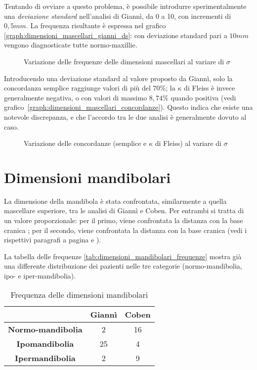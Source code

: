 Tentando di ovviare a questo problema, è possibile introdurre sperimentalmente una \emph{deviazione standard} nell'analisi di Giannì, da 0 a 10, con incrementi di $0,5 mm$. La frequenza risultante è espressa nel grafico \vref{graph:dimensioni_mascellari_gianni_ds}: con deviazione standard pari a $10 mm$ vengono diagnosticate tutte normo-maxillie.

\begin{figure}[ht!]
\centering

\caption{Variazione delle frequenze delle dimensioni mascellari al variare di $\sigma$}
\label{graph:dimensioni_mascellari_gianni_ds}
\end{figure}

Introducendo una deviazione standard al valore proposto da Giannì, solo la concordanza semplice raggiunge valori di più del $70\%$; la $\kappa$ di Fleiss è invece generalmente negativa, o con valori di massimo $8,74\%$ quando positiva (vedi grafico~\vref{graph:dimensioni_mascellari_concordanze}). Questo indica che esiste una notevole discrepanza, e che l'accordo tra le due analisi è generalmente dovuto al caso.

\begin{figure}[ht!]
\centering

\caption{Variazione delle concordanze (semplice e $\kappa$ di Fleiss) al variare di $\sigma$}
\label{graph:dimensioni_mascellari_concordanze}
\end{figure}

\section{Dimensioni mandibolari}
La dimensione della mandibola è stata confrontata, similarmente a quella mascellare superiore, tra le analisi di Giannì e Coben. Per entrambi si tratta di un valore proporzionale: per il primo, viene confrontata la distanza  con la base cranica ; per il secondo, viene confrontata la distanza  con la base cranica  (vedi i rispettivi paragrafi a pagina \pageref{sec:giannì_mandibola} e \pageref{sec:coben_mandibola}).

La tabella delle frequenze \vref{tab:dimensioni_mandibolari_frequenze} mostra già una differente distribuzione dei pazienti nelle tre categorie (normo-mandibolia, ipo- e iper-mandibolia).

\begin{table}[h]
\centering
\caption{Frequenza delle dimensioni mandibolari}
\label{tab:dimensioni_mandibolari_frequenze}
\begin{tabular}{>{\bfseries}ccc}
\toprule
 & \textbf{Giannì} & \textbf{Coben} \\
\midrule
Normo-mandibolia & 2 & 16 \\
Ipomandibolia & 25 & 4 \\
Ipermandibolia & 2 & 9 \\
\bottomrule
\end{tabular}
\end{table}

